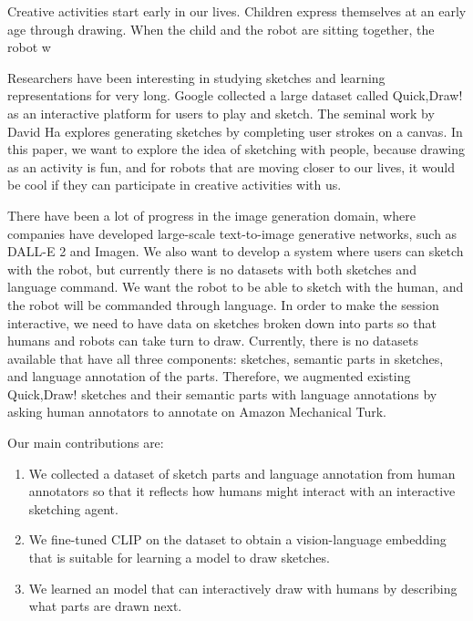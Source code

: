 

Creative activities start early in our lives. Children express themselves at an early age through drawing. 
When the child and the robot are sitting together, the robot w

Researchers have been interesting in studying sketches and learning representations for very long. Google collected a large dataset called Quick,Draw! as an interactive platform for users to play and sketch. The seminal work by David Ha explores generating sketches by completing user strokes on a canvas. In this paper, we want to explore the idea of sketching with people, because drawing as an activity is fun, and for robots that are moving closer to our lives, it would be cool if they can participate in creative activities with us. 

There have been a lot of progress in the image generation domain, where companies have developed large-scale text-to-image generative networks, such as DALL-E 2 and Imagen. We also want to develop a system where users can sketch with the robot, but currently there is no datasets with both sketches and language command. We want the robot to be able to sketch with the human, and the robot will be commanded through language. In order to make the session interactive, we need to have data on sketches broken down into parts so that humans and robots can take turn to draw. Currently, there is no datasets available that have all three components: sketches, semantic parts in sketches, and language annotation of the parts. Therefore, we augmented existing Quick,Draw! sketches and their semantic parts with language annotations by asking human annotators to annotate on Amazon Mechanical Turk.

Our main contributions are:
\begin{enumerate}
    \item We collected a dataset of sketch parts and language annotation from human annotators so that it reflects how humans might interact with an interactive sketching agent. \item We fine-tuned CLIP on the dataset to obtain a vision-language embedding that is suitable for learning a model to draw sketches. 
    \item We learned an model that can interactively draw with humans by describing what parts are drawn next. 
\end{enumerate}